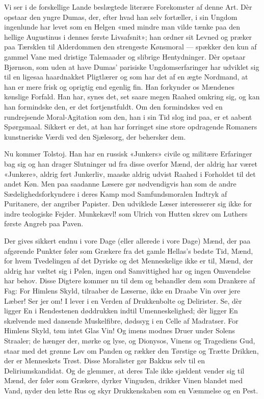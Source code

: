 \documentclass[12pt,a4paper]{article}
\begin{document}
Vi ser i de forskellige Lande beslægtede literære Forekomster af denne
Art. Dèr opstaar den yngre Dumas, der, efter hvad han selv fortæller, i
sin Ungdom ingenlunde har levet som en Helgen «med mindre man vilde tænke
paa den hellige Augustinus i dennes første Livsafsnit»; han ordner sit
Levned og præker paa Tærsklen til Alderdommen den strengeste Kønsmoral
--- spækker den kun af gammel Vane med dristige Talemaader og slibrige
Hentydninger. Dèr opstaar Bjørnson, som uden at have Dumas' parisiske
Ungdomserfaringer har udviklet sig til en ligesaa haardnakket Pligtlærer
og som har det af en ægte Nordmand, at han er mere frisk og oprigtig end
egenlig fin. Han forkynder os Mændenes kønslige Forfald. Han har, synes
det, set saare megen Raahed omkring sig, og kan han formindske den, er
det fortjenstfuldt. Om den formindskes ved en rundrejsende Moral-Agitation
som den, han i sin Tid slog ind paa, er et aabent Spørgsmaal. Sikkert er
det, at han har forringet sine store opdragende Romaners kunstneriske
Værdi ved den Sjælesorg, der behersker dem.

Nu kommer Tolstoj. Han har en russisk «Junkers» civile og militære
Erfaringer bag sig og han drager Slutninger ud fra disse overfor Mænd,
der aldrig har været «Junkere», aldrig ført Junkerliv, maaske aldrig
udvist Raahed i Forholdet til det andet Køn. Men paa saadanne Læsere
gør nødvendigvis han som de andre Sædelighedsforkyndere i deres Kamp mod
Samfundsmoralen Indtryk af Puritanere, der angriber Papister. Den udviklede
Læser interesserer sig ikke for indre teologiske Fejder. Munkekævl! som
Ulrich von Hutten skrev om Luthers første Angreb paa Paven.

Der gives sikkert endnu i vore Dage (eller allerede i vore Dage) Mænd,
der paa afgørende Punkter føler som Grækere fra det gamle Hellas's bedste
Tid, Mænd, for hvem Tvedelingen af det Dyriske og det Menneskelige ikke
er til, Mænd, der aldrig har væltet sig i Pølen, ingen ond Samvittighed
har og ingen Omvendelse har behov. Disse Digtere kommer nu til dem og
behandler dem som Drankere af Fag: For Himlens Skyld, tilraaber de
Læserne, ikke en Draabe Vin over jere Læber! Ser jer om! I lever i en
Verden af Drukkenbolte og Delirister. Se, dèr ligger En i Rendestenen
døddrukken indtil Umenneskelighed; dèr ligger En skælvende med dansende
Muskelfibre, dødssyg i en Celle af Madratser. For Himlens Skyld, tøm
intet Glas Vin! Og imens modnes Druer under Solens Straaler; de hænger
der, mørke og lyse, og Dionysos, Vinens og Tragediens Gud, staar med det
grønne Løv om Panden og rækker den Tørstige og Trætte Drikken, der er
Menneskets Trøst. Disse Moralister gør Bakkus selv til en
Deliriumskandidat. Og de glemmer, at deres Tale ikke sjældent vender sig
til Mænd, der føler som Grækere, dyrker Vinguden, drikker Vinen blandet
med Vand, nyder den lette Rus og skyr Drukkenskaben som en Væmmelse og
en Pest.
\end{document}
